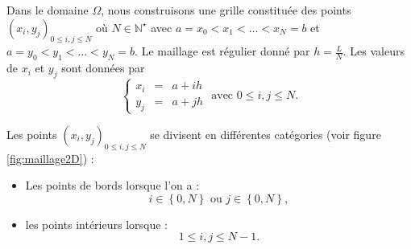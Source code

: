 Dans le domaine $\Omega$, nous construisons une grille constituée des points $(x_i,y_j)_{0 \leq i,j \leq N}$ où $N \in \mathbb{N}^{\star}$ avec $a = x_0 < x_1 < \ldots < x_N = b$ et $a = y_0 < y_1 < \ldots < y_N = b$. Le maillage est régulier donné par $h = \frac{L}{N}$. Les valeurs de $x_i$ et $y_j$ sont données par
\begin{equation}
\left\lbrace\begin{array}{rcl}
x_i & = & a + i h \\
y_j & = & a + j h 
\end{array}\right. \text{ avec } 0 \leq i,j \leq N.
\end{equation}

Les points $(x_i,y_j)_{0 \leq i,j \leq N}$ se divisent en différentes catégories (voir figure \ref{fig:maillage2D}) :
\begin{itemize}
\item Les points de bords lorsque l'on a :
\begin{equation}
i \in \left\lbrace 0 , N \right\rbrace \text{ ou } j \in \left\lbrace 0 , N \right\rbrace,
\end{equation}
\item les points intérieurs lorsque :
\begin{equation}
1 \leq i,j \leq N-1.
\end{equation}
\end{itemize}



